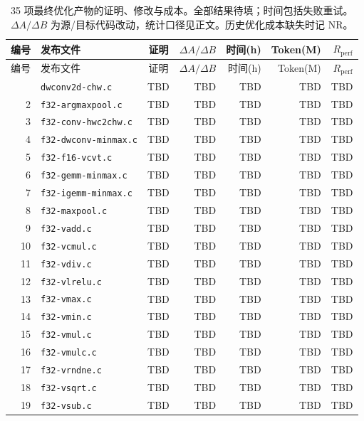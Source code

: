 {\scriptsize
\setlength{\tabcolsep}{5pt}
\renewcommand{\arraystretch}{1.17}
\begin{longtable}{@{}rlcrrrr@{}}
\caption{35 项最终优化产物的证明、修改与成本。全部结果待填；时间包括失败重试。$\Delta A/\Delta B$ 为源/目标代码改动，统计口径见正文。历史优化成本缺失时记 NR。}\label{tab:kernels}\\
\toprule
编号 & 发布文件 & 证明 & $\Delta A/\Delta B$ & 时间(h) & Token(M) & $R_{\mathrm{perf}}$ \\
\midrule
\endfirsthead
\toprule
编号 & 发布文件 & 证明 & $\Delta A/\Delta B$ & 时间(h) & Token(M) & $R_{\mathrm{perf}}$ \\
\midrule
\endhead
\bottomrule
\endfoot
1 & \texttt{dwconv2d-chw.c} & TBD & TBD & TBD & TBD & TBD \\
2 & \texttt{f32-argmaxpool.c} & TBD & TBD & TBD & TBD & TBD \\
3 & \texttt{f32-conv-hwc2chw.c} & TBD & TBD & TBD & TBD & TBD \\
4 & \texttt{f32-dwconv-minmax.c} & TBD & TBD & TBD & TBD & TBD \\
5 & \texttt{f32-f16-vcvt.c} & TBD & TBD & TBD & TBD & TBD \\
6 & \texttt{f32-gemm-minmax.c} & TBD & TBD & TBD & TBD & TBD \\
7 & \texttt{f32-igemm-minmax.c} & TBD & TBD & TBD & TBD & TBD \\
8 & \texttt{f32-maxpool.c} & TBD & TBD & TBD & TBD & TBD \\
9 & \texttt{f32-vadd.c} & TBD & TBD & TBD & TBD & TBD \\
10 & \texttt{f32-vcmul.c} & TBD & TBD & TBD & TBD & TBD \\
11 & \texttt{f32-vdiv.c} & TBD & TBD & TBD & TBD & TBD \\
12 & \texttt{f32-vlrelu.c} & TBD & TBD & TBD & TBD & TBD \\
13 & \texttt{f32-vmax.c} & TBD & TBD & TBD & TBD & TBD \\
14 & \texttt{f32-vmin.c} & TBD & TBD & TBD & TBD & TBD \\
15 & \texttt{f32-vmul.c} & TBD & TBD & TBD & TBD & TBD \\
16 & \texttt{f32-vmulc.c} & TBD & TBD & TBD & TBD & TBD \\
17 & \texttt{f32-vrndne.c} & TBD & TBD & TBD & TBD & TBD \\
18 & \texttt{f32-vsqrt.c} & TBD & TBD & TBD & TBD & TBD \\
19 & \texttt{f32-vsub.c} & TBD & TBD & TBD & TBD & TBD \\

\end{longtable}}
